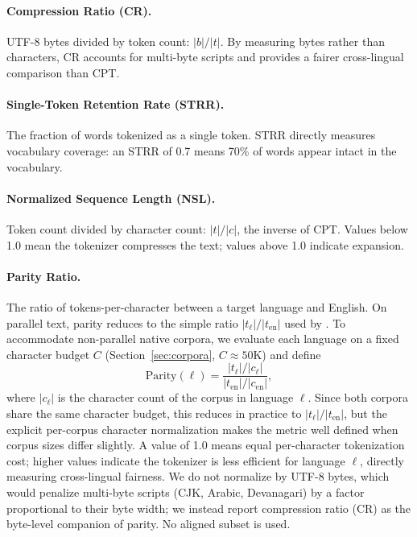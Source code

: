 \documentclass[11pt]{article}
\begin{document}
\paragraph{Compression Ratio (CR).} UTF-8 bytes divided by token count: $|b| / |t|$. By measuring bytes rather than characters, CR accounts for multi-byte scripts and provides a fairer cross-lingual comparison than CPT.

\paragraph{Single-Token Retention Rate (STRR).} The fraction of words tokenized as a single token. STRR directly measures vocabulary coverage: an STRR of 0.7 means 70\% of words appear intact in the vocabulary.

\paragraph{Normalized Sequence Length (NSL).} Token count divided by character count: $|t| / |c|$, the inverse of CPT. Values below 1.0 mean the tokenizer compresses the text; values above 1.0 indicate expansion.

\paragraph{Parity Ratio.} The ratio of tokens-per-character between a target language and English. On parallel text, parity reduces to the simple ratio $|t_\ell| / |t_\text{en}|$ used by \citet{petrov-etal-2024-language}. To accommodate non-parallel native corpora, we evaluate each language on a fixed character budget $C$ (Section~\ref{sec:corpora}, $C \approx 50\text{K}$) and define
\begin{equation}
    \text{Parity}(\ell) = \frac{|t_\ell| / |c_\ell|}{|t_\text{en}| / |c_\text{en}|},
\end{equation}
where $|c_\ell|$ is the character count of the corpus in language $\ell$. Since both corpora share the same character budget, this reduces in practice to $|t_\ell| / |t_\text{en}|$, but the explicit per-corpus character normalization makes the metric well defined when corpus sizes differ slightly. A value of 1.0 means equal per-character tokenization cost; higher values indicate the tokenizer is less efficient for language $\ell$, directly measuring cross-lingual fairness. We do not normalize by UTF-8 bytes, which would penalize multi-byte scripts (CJK, Arabic, Devanagari) by a factor proportional to their byte width; we instead report compression ratio (CR) as the byte-level companion of parity. No aligned subset is used.
\end{document}
